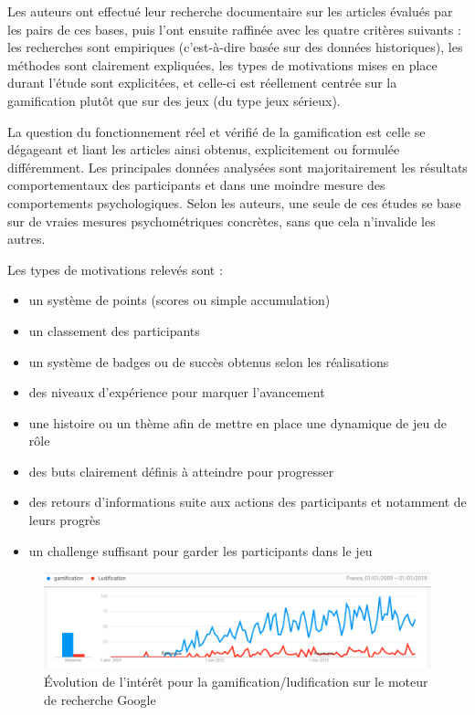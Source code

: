 Les auteurs ont effectué leur recherche documentaire sur les articles évalués par les pairs de ces bases, puis l'ont ensuite raffinée avec les quatre critères suivants : les recherches sont empiriques (c’est-à-dire basée sur des données historiques), les méthodes sont clairement expliquées, les types de motivations mises en place durant l’étude sont explicitées, et celle-ci est réellement centrée sur la gamification plutôt que sur des jeux (du type jeux sérieux).\par

La question du fonctionnement réel et vérifié de la gamification est celle se dégageant et liant les articles ainsi obtenus, explicitement ou formulée différemment. Les principales données analysées sont majoritairement les résultats comportementaux des participants et dans une moindre mesure des comportements psychologiques. Selon les auteurs, une seule de ces études se base sur de vraies mesures psychométriques concrètes, sans que cela n'invalide les autres. \par

Les types de motivations relevés sont :
\begin{itemize}
    \item un système de points (scores ou simple accumulation)
    \item un classement des participants
    \item un système de badges ou de succès obtenus selon les réalisations
    \item des niveaux d'expérience pour marquer l'avancement
    \item une histoire ou un thème afin de mettre en place une dynamique de jeu de rôle
    \item des buts clairement définis à atteindre pour progresser
    \item des retours d'informations suite aux actions des participants et notamment de leurs progrès
    \item un challenge suffisant pour garder les participants dans le jeu
\end{itemize}

\begin{figure}
    \centering
    \includegraphics[width=\linewidth]{Images/trends_gamification.png}
    \caption{Évolution de l'intérêt pour la gamification/ludification sur le moteur de recherche Google}
    \label{fig:trends}
\end{figure}

